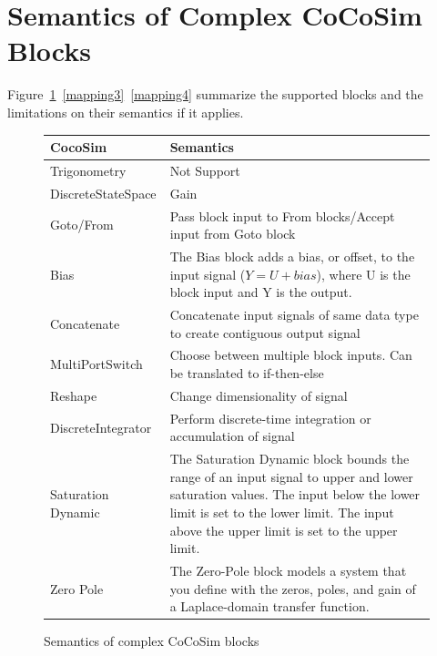 \documentclass{article}
\begin{document}
\section{Semantics of Complex CoCoSim Blocks}

Figure~\ref{mapping2}~\ref{mapping3}~\ref{mapping4} summarize the supported blocks and the limitations on their semantics if it applies. 

\begin{figure}[t]
\centering
{
\begin{tabular}{lp{5cm}}
\hline
\textbf{CocoSim} & \textbf{Semantics}  \\
\hline

Trigonometry &
Not Support
\\

DiscreteStateSpace &
Gain
\\

Goto/From &
Pass block input to From blocks/Accept input from Goto block
\\

Bias &
The Bias block adds a bias, or offset, to the input signal ($Y = U + bias$), where U is the block input and Y is the output.
\\

Concatenate &
Concatenate input signals of same data type to create contiguous output signal
\\

MultiPortSwitch &
Choose between multiple block inputs. Can be translated to if-then-else
\\

Reshape &
Change dimensionality of signal
\\

DiscreteIntegrator &
Perform discrete-time integration or accumulation of signal
\\

Saturation Dynamic &
The Saturation Dynamic block bounds the range of an input signal to upper and lower saturation values. The input below the lower limit is set to the lower limit. The input above the upper limit is set to the upper limit.
\\

Zero Pole &
The Zero-Pole block models a system that you define with the zeros, poles, and gain of a Laplace-domain transfer function. 
\\

\hline
\end{tabular}
}
\caption{Semantics of complex CoCoSim blocks}
\label{mapping2}
\end{figure}
\end{document}
